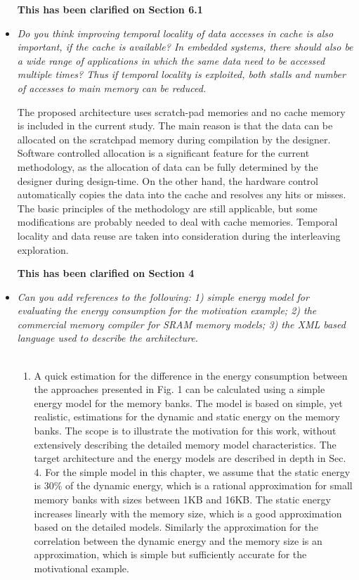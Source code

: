 \documentclass[12pt,a4paper,notitlepage]{article}
\begin{document}
\begin{itemize}
\textbf{This has been clarified on Section 6.1}

\item \textit{Do you think improving temporal locality of data accesses in cache is also important, if the cache is available? In embedded systems, there should also be a wide range of applications in which the same data need to be accessed multiple times? Thus if temporal locality is exploited, both stalls and number of accesses to main memory can be reduced.}

The proposed architecture uses scratch-pad memories and no cache memory is included in the current study.
The main reason is that the data can be allocated on the scratchpad memory during compilation by the designer.
Software controlled allocation is a significant feature for the current methodology, as the allocation of data can be fully determined by the designer during design-time.
On the other hand, the hardware control automatically copies the data into the cache and resolves any hits or misses.
The basic principles of the methodology are still applicable, but some modifications are probably needed to deal with cache memories.
Temporal locality and data reuse are taken into consideration during the interleaving exploration.

\textbf{This has been clarified on Section 4}

\item \textit{Can you add references to the following: 1) simple energy model for evaluating the energy consumption for the motivation example; 2) the commercial memory compiler for SRAM memory models; 3) the XML based language used to describe the architecture.}
\\
\\
\begin{enumerate}
\item A quick estimation for the difference in the energy consumption between the approaches presented in Fig. 1 can be calculated using a simple energy model for the memory banks. 
The model is based on simple, yet realistic, estimations for the dynamic and static energy on the memory banks.
The scope is to illustrate the motivation for this work, without extensively describing the detailed memory model characteristics. 
The target architecture and the energy models are described in depth in Sec. 4. 
For the simple model in this chapter, we assume that the static energy is 30\% of the dynamic energy, which is a rational approximation for small memory banks with sizes between 1KB and 16KB.
The static energy increases linearly with the memory size, which is a good approximation based on the detailed models.
Similarly the approximation for the correlation between the dynamic energy and the memory size is an approximation, which is simple but sufficiently accurate for the motivational example.


\end{enumerate}
\end{itemize}
\end{document}
